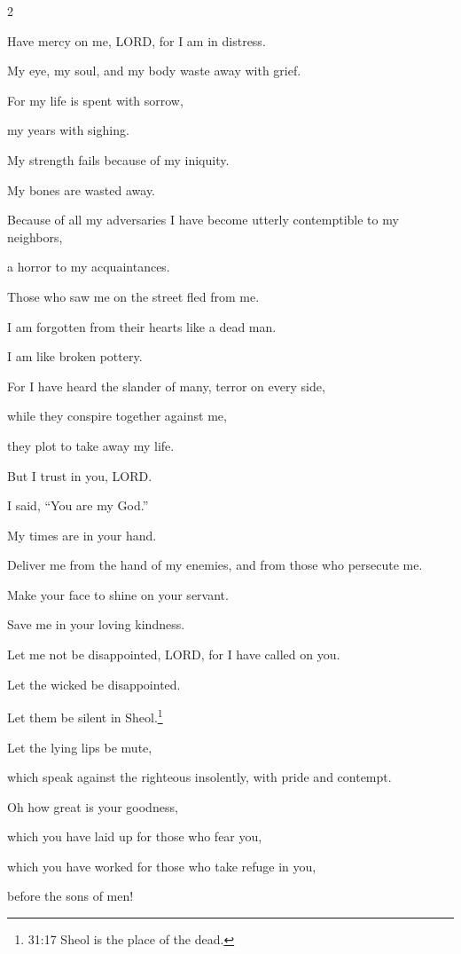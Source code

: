 \begin{multicols}{2}
	
	\myverse{}Have mercy on me, LORD, for I am in distress.
	
	My eye, my soul, and my body waste away with grief.
	
	
	\myverse{}For my life is spent with sorrow,
	
	my years with sighing.
	
	My strength fails because of my iniquity.
	
	My bones are wasted away.
	
	
	\myverse{}Because of all my adversaries I have become utterly contemptible
	to my neighbors,
	
	a horror to my acquaintances.
	
	Those who saw me on the street fled from me.
	
	
	\myverse{}I am forgotten from their hearts like a dead man.
	
	I am like broken pottery.
	
	
	\myverse{}For I have heard the slander of many, terror on every side,
	
	while they conspire together against me,
	
	they plot to take away my life.
	
	
	\myverse{}But I trust in you, LORD.
	
	I said, “You are my God.”
	
	
	\myverse{}My times are in your hand.
	
	Deliver me from the hand of my enemies, and from those who persecute me.
	
	
	\myverse{}Make your face to shine on your servant.
	
	Save me in your loving kindness.
	
	
	\myverse{}Let me not be disappointed, LORD, for I have called on you.
	
	Let the wicked be disappointed.
	
	Let them be silent in Sheol.\footnote{31:17 Sheol is the place of the dead.}
	
	
	\myverse{}Let the lying lips be mute,
	
	which speak against the righteous insolently, with pride and contempt.
	
	
	\myverse{}Oh how great is your goodness,
	
	which you have laid up for those who fear you,
	
	which you have worked for those who take refuge in you,
	
	before the sons of men!
	

\end{multicols}
